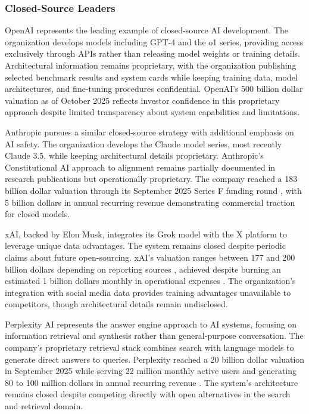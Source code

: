 \subsubsection{Closed-Source Leaders}

OpenAI represents the leading example of closed-source AI development. The organization develops models including GPT-4 and the o1 series, providing access exclusively through APIs rather than releasing model weights or training details. Architectural information remains proprietary, with the organization publishing selected benchmark results and system cards while keeping training data, model architectures, and fine-tuning procedures confidential. OpenAI's 500 billion dollar valuation as of October 2025 \cite{openai2025} reflects investor confidence in this proprietary approach despite limited transparency about system capabilities and limitations.

Anthropic pursues a similar closed-source strategy with additional emphasis on AI safety. The organization develops the Claude model series, most recently Claude 3.5, while keeping architectural details proprietary. Anthropic's Constitutional AI approach to alignment remains partially documented in research publications but operationally proprietary. The company reached a 183 billion dollar valuation through its September 2025 Series F funding round \cite{anthropic2025}, with 5 billion dollars in annual recurring revenue demonstrating commercial traction for closed models.

xAI, backed by Elon Musk, integrates its Grok model with the X platform to leverage unique data advantages. The system remains closed despite periodic claims about future open-sourcing. xAI's valuation ranges between 177 and 200 billion dollars depending on reporting sources \cite{xai_cnbc2025, xai_yahoo2025}, achieved despite burning an estimated 1 billion dollars monthly in operational expenses \cite{xai_tomshardware2025}. The organization's integration with social media data provides training advantages unavailable to competitors, though architectural details remain undisclosed.

Perplexity AI represents the answer engine approach to AI systems, focusing on information retrieval and synthesis rather than general-purpose conversation. The company's proprietary retrieval stack combines search with language models to generate direct answers to queries. Perplexity reached a 20 billion dollar valuation in September 2025 \cite{perplexity2025} while serving 22 million monthly active users and generating 80 to 100 million dollars in annual recurring revenue \cite{perplexity_demandsage2025}. The system's architecture remains closed despite competing directly with open alternatives in the search and retrieval domain.

